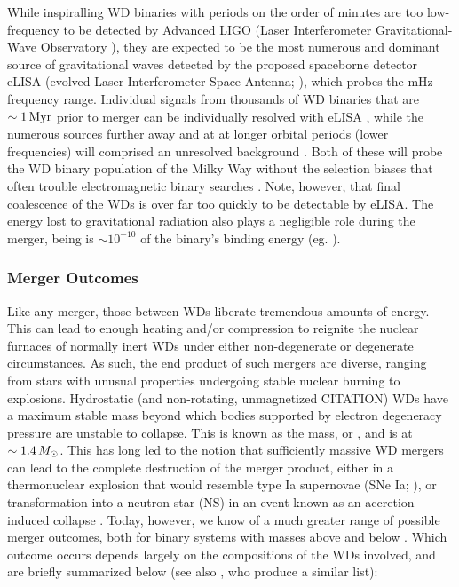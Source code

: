 While inspiralling WD binaries with periods on the order of minutes are too low-frequency to be detected by Advanced LIGO (Laser Interferometer Gravitational-Wave Observatory \citealt{ligo+15}), they are expected to be the most numerous and dominant source of gravitational waves \citep{mars11} detected by the proposed spaceborne detector eLISA (evolved Laser Interferometer Space Antenna; \citealt{amar+13}), which probes the mHz frequency range.  Individual signals from thousands of WD binaries that are $\sim1\,\mathrm{Myr}$ prior to merger can be individually resolved with eLISA \citep{amar+13,loreig09, dan+11}, while the numerous sources further away and at at longer orbital periods (lower frequencies) will comprised an unresolved background \cite{neleyp01,amar+13}.  Both of these will probe the WD binary population of the Milky Way without the selection biases that often trouble electromagnetic binary searches \citep{mars11}.  {\charles Note, however, that final coalescence of the WDs is over far too quickly to be detectable by eLISA.}  The energy lost to gravitational radiation also plays a negligible role during the merger, being is $\sim10^{-10}$ of the binary's binding energy (eg. \citealt{loreig09}).

\subsubsection{Merger Outcomes}

Like any merger, those between WDs liberate tremendous amounts of energy.  This can lead to enough heating and/or compression to reignite the nuclear furnaces of normally inert WDs under either non-degenerate or degenerate circumstances.  As such, the end product of such mergers are diverse, ranging from stars with unusual properties undergoing stable nuclear burning to explosions. Hydrostatic (and non-rotating, unmagnetized {\charles CITATION}) WDs have a maximum stable mass beyond which bodies supported by electron degeneracy pressure are unstable to collapse.  This is known as the \cite{chan31} mass, or \Mch, and is at $\sim1.4\,\Msun$.  This has long led to the notion that sufficiently massive WD mergers can lead to the complete destruction of the merger product, either in a thermonuclear explosion that would resemble type Ia supernovae (SNe Ia; \citealt{webb84}), or transformation into a neutron star (NS) in an event known as an accretion-induced collapse \citep{nomoi85, saion85}.  Today, however, we know of a much greater range of possible merger outcomes, both for binary systems with masses above and below \Mch.  Which outcome occurs depends largely on the compositions of the WDs involved, and are briefly summarized below (see also \citealt{dan+14}, who produce a similar list):

